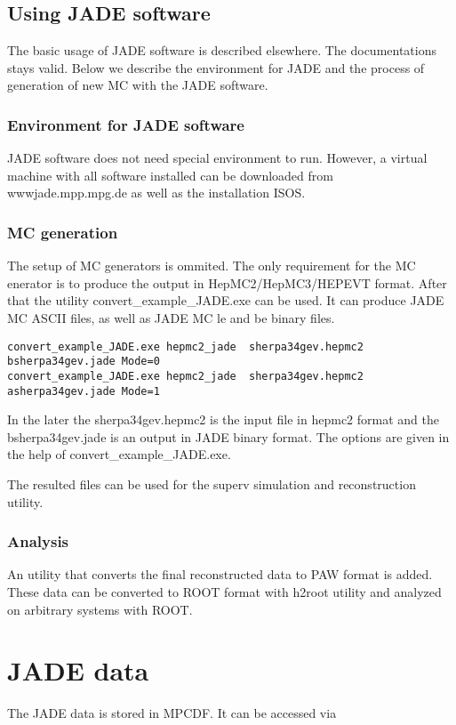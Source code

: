 \subsection{Using JADE software}
The basic usage of JADE software is described elsewhere.
The documentations stays valid.
Below we describe the environment for JADE and the process of generation of new MC with the JADE software.

\subsubsection{Environment for JADE software}
JADE software does not need special environment to run.
However, a virtual machine with all software installed can be downloaded 
from wwwjade.mpp.mpg.de as well as the installation ISOS.

\subsubsection{MC generation}

The setup of MC generators is ommited.
The only requirement for the MC enerator is to produce the 
output in HepMC2/HepMC3/HEPEVT format.
After that the utility convert\_example\_JADE.exe can be used.
It can produce JADE MC ASCII  files, as well as JADE MC le and be binary files.

\begin{Verbatim}[fontsize=\tiny]
convert_example_JADE.exe hepmc2_jade  sherpa34gev.hepmc2   bsherpa34gev.jade Mode=0
convert_example_JADE.exe hepmc2_jade  sherpa34gev.hepmc2   asherpa34gev.jade Mode=1
\end{Verbatim}
In the later the sherpa34gev.hepmc2 is the input file in hepmc2 format and the bsherpa34gev.jade is an output in JADE binary format.
The options are given in the help of convert\_example\_JADE.exe.

The resulted files can be used for the superv simulation and reconstruction utility.
\subsubsection{Analysis}
An utility that converts the final reconstructed data to PAW format is added.
These data can be converted to ROOT format with h2root utility and analyzed on arbitrary systems with ROOT.



\section{JADE data}
The JADE data is stored in MPCDF.
It can be accessed via 

